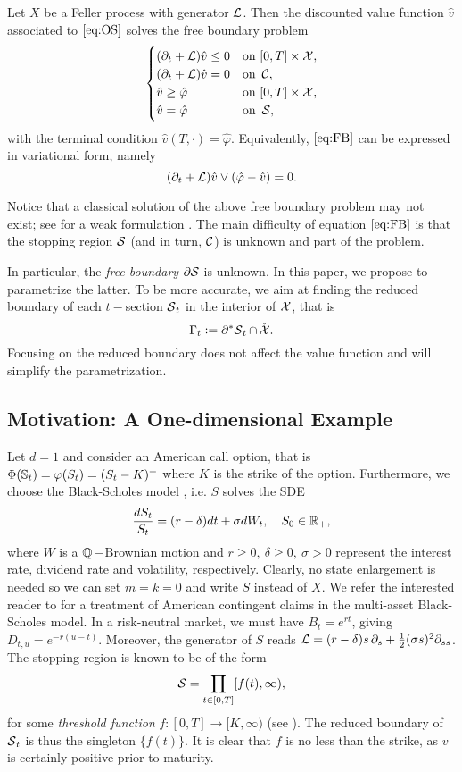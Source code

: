 \begin{theorem} Let $X$ be a Feller process with generator $\operatorname{\mathcal{L}}$. Then the discounted value function $\hat{v}$ associated to  $\eqref{eq:OS}$ solves the free boundary problem 
\begin{align}\label{eq:FB}
    \begin{cases}
    (\partial_t + \operatorname{\mathcal{L}})\hat{v} \le 0 &  \text{on } [0,T] \times \operatorname{\mathcal{X}},\\
    (\partial_t + \operatorname{\mathcal{L}})\hat{v} = 0  & \text{on } \operatorname{\mathcal{C}},\\
   \hat{v} \ge \hat{\varphi} & \text{on } [0,T] \times \operatorname{\mathcal{X}},\\
    \hat{v}= \hat{\varphi}  & \text{on } \operatorname{\mathcal{S}},
    \end{cases}
\end{align}
with  the terminal condition $\hat{v}(T,\cdot)= \hat{\varphi}$. Equivalently, $\eqref{eq:FB}$ can be expressed in variational form, namely 
$$ (\partial_t + \operatorname{\mathcal{L}})\hat{v} \vee (\hat{\varphi} - \hat{v}) = 0.$$
\end{theorem}
Notice that a classical solution of the above free boundary problem  may not exist; see \citet{JLL} for a weak formulation . 
The main difficulty of equation $\eqref{eq:FB}$ is that the stopping region $\operatorname{\mathcal{S}}$ (and in turn, $\operatorname{\mathcal{C}}$) is unknown and  part of the problem. 

In particular, the \textit{free boundary} $\partial \!  \operatorname{\mathcal{S}}$ is unknown. In this paper, 
 we propose to parametrize the latter. To be more accurate, we aim at finding the  reduced  boundary of each $t-$section $\operatorname{\mathcal{S}}_t$ in the interior of $\operatorname{\mathcal{X}}$, that is  
 $$\Gamma_t := \partial^*\! \operatorname{\mathcal{S}}_t \cap \, \mathring{\operatorname{\mathcal{X}}}.$$
 Focusing on the reduced boundary does not affect the value function and will simplify the parametrization. 
 \subsection{Motivation: A One-dimensional Example} \label{sec:1DExample}
 Let $d=1$ and consider an American call option, that is $\Phi(\operatorname{\mathbb{S}}_t)=\varphi(S_t)=(S_t-K)^+$ where $K$ is the strike of the option. 
 Furthermore, we choose the Black-Scholes model \cite{BS}, i.e. $S$ solves the SDE 
 $$\frac{dS_t}{S_t} = (r-\delta)dt + \sigma dW_t, \quad S_0\in \operatorname{\mathbb{R}}_+,$$
 where $W$ is a $\operatorname{\mathbb{Q}}-$Brownian motion and  $r\ge 0,\ \delta \ge 0 ,\ \sigma > 0$ represent the interest rate, dividend rate and volatility, respectively.  Clearly, no  state enlargement is needed so we can set $m=k=0$ and write $S$ instead of $X$.
We refer the interested reader to \citet{Karatzas} for a treatment of American contingent claims in the multi-asset Black-Scholes model. 
In a risk-neutral market, we must have $B_t=e^{rt}$, giving $D_{t,u} = e^{-r(u-t)}$. Moreover, the generator of $S$ reads $\operatorname{\mathcal{L}} = (r-\delta)s\,  \partial_s + \frac{1}{2}(\sigma s)^2\partial_{ss}$. 
The  stopping region is known to be of the form $$\operatorname{\mathcal{S}} = \prod_{t\in [0,T]} [f(t), \infty), $$
 for some \textit{threshold function} $f:[0,T]\to [K,\infty)$  (see \cite{Merton,VB}).  The reduced boundary of $\operatorname{\mathcal{S}}_t$ is thus   the singleton $  \{f(t)\}$.
 It is clear that $f$ is no less than the strike, as  
 $v$ is certainly positive prior to maturity. 
 
